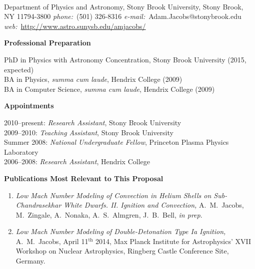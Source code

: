 \documentclass[11pt,letterpaper,english]{article}
\begin{document}
\setlength{\parindent}{0in} %

\pagestyle{fancy}   \renewcommand{%
\headrulewidth}{0.0pt}


\thispagestyle{plain}

\\
{Department of Physics and Astronomy, Stony Brook University, Stony Brook, NY 11794-3800} \smallskip
{{\it phone:}~(501) 326-8316 \hskip 2mm
{\it e-mail:}~Adam.Jacobs@stonybrook.edu \hskip 2mm \\[-0.25em]
{\it web:}~\url{http://www.astro.sunysb.edu/amjacobs/}}

\begin{flushleft} {\bf Professional Preparation}
{\parindent 16pt

PhD in Physics with Astronomy Concentration, Stony Brook University (2015, expected)\\ 
BA in Physics, \emph{summa cum laude}, Hendrix College (2009)\\ 
BA in Computer Science, \emph{summa cum laude}, Hendrix College (2009)\\ 
}

\vspace{.04in}
{\bf Appointments}
{\parindent 16pt

2010--present: {\em Research Assistant}, Stony Brook University \\ 
2009--2010: {\em Teaching Assistant}, Stony Brook University \\ 
Summer 2008:  {\em National Undergraduate Fellow}, Princeton Plasma Physics Laboratory \\ 
2006--2008: {\em Research Assistant}, Hendrix College \\
}

\vspace{.04in}
{\bf Publications Most Relevant to This Proposal}
\vspace{-6pt}
\begin{enumerate} \itemsep1pt \parskip0pt 
\item {\it Low Mach Number Modeling of Convection in Helium Shells on
      Sub-Chandrasekhar White Dwarfs. II. Ignition and Convection,} A.~M.~Jacobs,
      M.~Zingale, A.~Nonaka, A.~S.~Almgren, J.~B.~Bell, {\em in prep}.

\item {\it Low Mach Number Modeling of Double-Detonation Type Ia Ignition,} 
      A.~M.~Jacobs, April 11$^{\mathrm{th}}$ 2014, Max Planck Institute for Astrophysics' 
      XVII Workshop on Nuclear Astrophysics, Ringberg Castle Conference Site, Germany.
  

\end{enumerate}
\end{flushleft}
\end{document}
